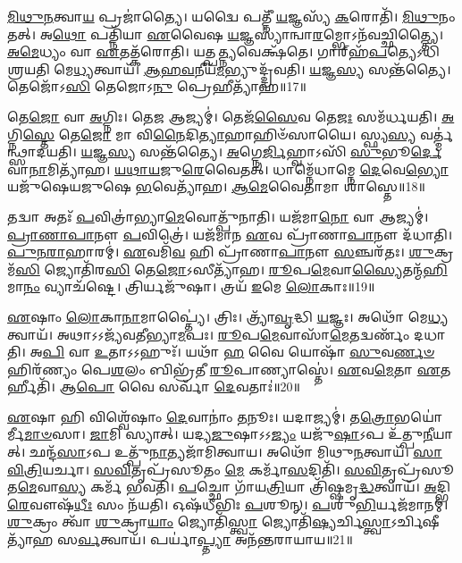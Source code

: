 \-\ul{𑌮𑌿}\-\-\ul{𑌥𑍁}\-\-\ul{𑌨}\-𑌤𑍍𑌵𑌾\-\ul{𑌯} 𑌪𑍍𑌰𑌜𑌾॑𑌤𑍍𑌯𑍈।
𑌯𑌦𑍍𑌵𑍈 𑌪𑌤𑍍𑌨𑍀᳴ \ul{𑌯}\-𑌜𑍍𑌞𑌸𑍍𑌯᳴ \ul{𑌕}\-𑌰𑍋𑌤𑌿᳴।
\-\ul{𑌮𑌿}\-\-\ul{𑌥𑍁}\-𑌨𑌂 𑌤𑌤𑍍।
𑌅\-\ul{𑌥𑍋} 𑌪𑌤𑍍𑌨𑌿᳴𑌯𑌾 \ul{𑌏}\-𑌵𑍈𑌷 \ul{𑌯}\-𑌜𑍍𑌞𑌸𑍍𑌯𑌾॑𑌨𑍍𑌵𑌾\-\ul{𑌰}\-𑌮𑍍𑌭𑍋\-𑌽𑌨᳴𑌵𑌚𑍍𑌛𑌿𑌤𑍍𑌤𑍍𑌯𑍈।
\-\ul{𑌅}\-\-\ul{𑌮𑍇}\-𑌧𑍍𑌯𑌂 𑌵𑌾 \ul{𑌏}\-𑌤𑌤𑍍𑌕᳴𑌰𑍋𑌤𑌿।
𑌯𑌤𑍍𑌪\-\ul{𑌤𑍍𑌨𑍍𑌯}\-𑌵𑍇𑌕𑍍𑌷᳴𑌤𑍇।
𑌗𑌾𑌰𑍍‌\mbox{}𑌹᳴\-\ul{𑌪}\-𑌤𑍍𑌯𑍇𑌽𑌧𑌿᳴ 𑌶𑍍𑌰𑌯𑌤𑌿 𑌮𑍇\-\ul{𑌧𑍍𑌯}\-𑌤𑍍𑌵𑌾𑌯᳴।
\-\ul{𑌆}\-\-\ul{𑌹}\-\-\ul{𑌵}\-𑌨𑍀𑌯᳴\-\ul{𑌮}\-𑌭𑍍𑌯𑍁𑌦𑍍𑌦𑍍𑌰᳴𑌵𑌤𑌿।
\-\ul{𑌯}\-𑌜𑍍𑌞\-\ul{𑌸𑍍𑌯} 𑌸𑌨𑍍𑌤᳴𑌤𑍍𑌯𑍈।
𑌤𑍇𑌜𑍋᳴𑌽\-\ul{𑌸𑌿} 𑌤𑍇𑌜𑍋𑌽\-\ul{𑌨𑍁} 𑌪𑍍𑌰𑍇𑌹𑍀𑌤𑍍𑌯𑌾᳴𑌹॥17॥

𑌤𑍇\-\ul{𑌜𑍋} 𑌵𑌾 \ul{𑌅}\-𑌗𑍍𑌨𑌿𑌃।
𑌤𑍇\-\ul{𑌜} 𑌆𑌜𑍍𑌯𑌮𑍍॑।
𑌤𑍇𑌜᳴\-\ul{𑌸𑍈}\-𑌵 𑌤𑍇\-\ul{𑌜𑌃} 𑌸𑌮᳴𑌰𑍍𑌧𑌯𑌤𑌿।
\-\ul{𑌅}\-𑌗𑍍𑌨𑌿\-\ul{𑌸𑍍𑌤𑍇} 𑌤𑍇\-\ul{𑌜𑍋} 𑌮𑌾 𑌵𑌿\-\ul{𑌨𑍈}\-𑌦𑌿\-\ul{𑌤𑍍𑌯𑌾}\-𑌹𑌾𑌹𑌿𑍞᳴𑌸𑌾𑌯𑍈।
𑌸𑍍𑌫𑍍𑌯\-\ul{𑌸𑍍𑌯} 𑌵𑌰𑍍𑌤𑍍𑌮॑𑌨𑍍𑌥𑍍𑌸𑌾𑌦𑌯𑌤𑌿।
\-\ul{𑌯}\-𑌜𑍍𑌞\-\ul{𑌸𑍍𑌯} 𑌸𑌨𑍍𑌤᳴𑌤𑍍𑌯𑍈।
\-\ul{𑌅}\-𑌗𑍍𑌨𑍇\-\ul{𑌰𑍍𑌜𑌿}\-𑌹𑍍𑌵𑌾𑌽𑌸𑌿᳴ \ul{𑌸𑍁}\-𑌭𑍂\-\ul{𑌰𑍍𑌦𑍇}\-𑌵𑌾\-\ul{𑌨𑌾}\-𑌮𑌿𑌤𑍍𑌯𑌾᳴𑌹।
\-\ul{𑌯}\-\-\ul{𑌥𑌾}\-\-\ul{𑌯}\-𑌜𑍁\-\ul{𑌰𑍇}\-𑌵𑍈𑌤𑌤𑍍।
𑌧𑌾𑌮𑍍𑌨𑍇᳴𑌧𑌾𑌮𑍍𑌨𑍇 \ul{𑌦𑍇}\-𑌵𑍇\-\ul{𑌭𑍍𑌯𑍋} 𑌯𑌜𑍁᳴𑌷𑍇𑌯𑌜𑍁𑌷𑍇 \ul{𑌭}\-𑌵𑍇𑌤𑍍𑌯𑌾᳴𑌹।
\-\ul{𑌆}\-\-\-\ul{𑌮𑍇}\-𑌵𑍈𑌤𑌾𑌮𑌾 𑌶𑌾॑𑌸𑍍𑌤𑍇॥18॥

𑌤𑌦𑍍𑌵𑌾 𑌅𑌤𑌃᳴ \ul{𑌪}\-𑌵𑌿𑌤𑍍𑌰𑌾॑𑌭𑍍𑌯𑌾\-\ul{𑌮𑍇}\-𑌵𑍋𑌤𑍍𑌪𑍁᳴𑌨𑌾𑌤𑌿।
𑌯𑌜᳴𑌮𑌾\-\ul{𑌨𑍋} 𑌵𑌾 𑌆𑌜𑍍𑌯𑌮𑍍॑।
\-\ul{𑌪𑍍𑌰𑌾}\-\-\ul{𑌣𑌾}\-\-\ul{𑌪𑌾}\-𑌨𑍗 \ul{𑌪}\-𑌵𑌿𑌤𑍍𑌰𑍇॑।
𑌯𑌜᳴𑌮𑌾𑌨 \ul{𑌏}\-𑌵 𑌪𑍍𑌰𑌾᳴𑌣𑌾\-\ul{𑌪𑌾}\-𑌨𑍗 𑌦᳴𑌧𑌾𑌤𑌿।
\-\ul{𑌪𑍁}\-\-\ul{𑌨}\-\-\ul{𑌰𑌾}\-𑌹𑌾𑌰𑌮𑍍॑।
\-\ul{𑌏}\-𑌵𑌮𑌿᳴\-\ul{𑌵} 𑌹𑌿 𑌪𑍍𑌰𑌾᳴𑌣𑌾\-\ul{𑌪𑌾}\-𑌨𑍗 \ul{𑌸}\-𑌞𑍍𑌚𑌰᳴𑌤𑌃।
\-\ul{𑌶𑍁}\-𑌕𑍍𑌰𑌮᳴\-\ul{𑌸𑌿} 𑌜𑍍𑌯𑍋𑌤𑌿᳴𑌰\-\ul{𑌸𑌿} 𑌤𑍇\-\ul{𑌜𑍋}\-\-𑌽𑌸𑍀𑌤𑍍𑌯𑌾᳴𑌹।
\-\ul{𑌰𑍂}\-𑌪\-\ul{𑌮𑍇}\-𑌵𑌾\-\ul{𑌸𑍍𑌯𑍈}\-𑌤𑌨𑍍𑌮᳴\-\ul{𑌹𑌿}\-𑌮𑌾\-\ul{𑌨𑌂} 𑌵𑍍𑌯𑌾𑌚᳴𑌷𑍍𑌟𑍇।
𑌤𑍍𑌰𑌿𑌰𑍍𑌯𑌜𑍁᳴𑌷𑌾।
𑌤𑍍𑌰𑌯᳴ \ul{𑌇}\-𑌮𑍇 \ul{𑌲𑍋}\-𑌕𑌾𑌃॥19॥

\-\ul{𑌏}\-𑌷𑌾𑌂 \ul{𑌲𑍋}\-𑌕𑌾\-\ul{𑌨𑌾}\-𑌮𑌾𑌪𑍍𑌤𑍍𑌯𑍈॑।
𑌤𑍍𑌰𑌿𑌃।
𑌤𑍍𑌰𑍍𑌯𑌾᳴\-\ul{𑌵𑍃}\-𑌦𑍍𑌧𑌿 \ul{𑌯}\-𑌜𑍍𑌞𑌃।
𑌅𑌥𑍋᳴ 𑌮𑍇\-\ul{𑌧𑍍𑌯}\-𑌤𑍍𑌵𑌾𑌯᳴।
𑌅𑌥𑌾𑌽𑌽𑌜𑍍𑌯᳴𑌵𑌤𑍀𑌭𑍍𑌯𑌾\-\ul{𑌮}\-𑌪𑌃।
\-\ul{𑌰𑍂}\-𑌪\-\ul{𑌮𑍇}\-𑌵𑌾𑌸𑌾᳴\-\ul{𑌮𑍇}\-𑌤𑌦𑍍𑌵𑌰𑍍𑌣𑌂᳴ 𑌦𑌧𑌾𑌤𑌿।
𑌅\-\ul{𑌪𑌿} 𑌵𑌾 \ul{𑌉}\-𑌤𑌾𑌽𑌽𑌹𑍁𑌃᳴।
𑌯𑌥𑌾᳴ \ul{𑌹} 𑌵𑍈 𑌯𑍋𑌷𑌾᳴ \ul{𑌸𑍁}\-𑌵\-\ul{𑌰𑍍𑌣}\-\-\ul{𑍞} 𑌹𑌿𑌰᳴𑌣𑍍𑌯𑌂 𑌪𑍇\-\ul{𑌶}\-𑌲𑌂 𑌬𑌿𑌭𑍍𑌰᳴𑌤𑍀 \ul{𑌰𑍂}\-𑌪𑌾𑌣𑍍𑌯𑌾𑌸𑍍𑌤𑍇॑।
\-\ul{𑌏}\-𑌵\-\ul{𑌮𑍇}\-𑌤𑌾 \ul{𑌏}\-𑌤𑌰𑍍\mbox{}𑌹𑍀𑌤𑌿᳴।
𑌆\-\ul{𑌪𑍋} 𑌵𑍈 𑌸𑌰𑍍𑌵𑌾᳴ \ul{𑌦𑍇}\-𑌵𑌤𑌾𑌃॑॥20॥

\-\ul{𑌏}\-𑌷𑌾 𑌹𑌿 𑌵𑌿𑌶𑍍𑌵𑍇᳴𑌷𑌾𑌂 \ul{𑌦𑍇}\-𑌵𑌾𑌨𑌾𑌂॑ \ul{𑌤}\-𑌨𑍂𑌃।
𑌯𑌦𑌾𑌜𑍍𑌯𑌮𑍍॑।
𑌤\-\ul{𑌤𑍍𑌰𑍋}\-𑌭𑌯𑍋॑𑌰𑍍𑌮𑍀\-\ul{𑌮𑌾}\-\-\ul{𑍞}\-𑌸𑌾।
\-\ul{𑌜𑌾}\-𑌮𑌿 𑌸𑍍𑌯𑌾𑌤𑍍।
𑌯𑌦𑍍𑌯\-\ul{𑌜𑍁}\-𑌷𑌾\-𑌽𑌽\-\ul{𑌜𑍍𑌯𑌂} 𑌯𑌜𑍁᳴\-\ul{𑌷𑌾}\-𑌽𑌪 𑌉᳴𑌤𑍍𑌪𑍁\-\ul{𑌨𑍀}\-𑌯𑌾𑌤𑍍।
𑌛𑌨𑍍𑌦᳴\-\ul{𑌸𑌾}\-𑌽𑌪 𑌉𑌤𑍍𑌪𑍁᳴\-\ul{𑌨𑌾}\-𑌤𑍍𑌯𑌜𑌾᳴𑌮𑌿𑌤𑍍𑌵𑌾𑌯।
𑌅𑌥𑍋᳴ 𑌮𑌿𑌥𑍁\-\ul{𑌨}\-𑌤𑍍𑌵𑌾𑌯᳴।
\-\ul{𑌸𑌾}\-\-\ul{𑌵𑌿}\-\-\ul{𑌤𑍍𑌰𑌿}\-𑌯𑌰𑍍𑌚𑌾।
\-\ul{𑌸}\-\-\ul{𑌵𑌿}\-𑌤𑍃𑌪𑍍𑌰᳴𑌸𑍂𑌤𑌂 \ul{𑌮𑍇} 𑌕𑌰𑍍𑌮𑌾᳴\-\ul{𑌸}\-𑌦𑌿𑌤𑌿᳴।
\-\ul{𑌸}\-\-\ul{𑌵𑌿}\-𑌤𑍃𑌪𑍍𑌰᳴𑌸𑍂𑌤\-\ul{𑌮𑍇}\-𑌵𑌾\-\ul{𑌸𑍍𑌯} 𑌕𑌰𑍍𑌮᳴ 𑌭𑌵𑌤𑌿।
\-\ul{𑌪}\-𑌚𑍍𑌛𑍋 𑌗𑌾᳴𑌯\-\ul{𑌤𑍍𑌰𑌿}\-𑌯𑌾 𑌤𑍍𑌰𑌿᳴𑌷𑍍𑌷𑌮𑍃\-\ul{𑌦𑍍𑌧}\-𑌤𑍍𑌵𑌾𑌯᳴।
\-\ul{𑌅}\-𑌦𑍍𑌭𑌿\-\ul{𑌰𑍇}\-𑌵𑍗𑌷᳴\-\ul{𑌧𑍀𑌃} 𑌸𑌂 𑌨᳴𑌯𑌤𑌿।
𑌓𑌷᳴𑌧𑍀𑌭𑌿𑌃 \ul{𑌪}\-𑌶𑍂𑌨𑍍।
\-\ul{𑌪}\-𑌶𑍁\-\ul{𑌭𑌿}\-𑌰𑍍𑌯𑌜᳴𑌮𑌾𑌨𑌮𑍍।
\-\ul{𑌶𑍁}\-𑌕𑍍𑌰𑌂 𑌤𑍍𑌵𑌾᳴ \ul{𑌶𑍁}\-𑌕𑍍𑌰𑌾\-\ul{𑌯𑌾𑌂} 𑌜𑍍𑌯𑍋𑌤𑌿᳴\-\ul{𑌸𑍍𑌤𑍍𑌵𑌾} 𑌜𑍍𑌯𑍋𑌤𑌿᳴\-\ul{𑌷𑍍𑌯}\-𑌰𑍍𑌚𑌿\-\ul{𑌸𑍍𑌤𑍍𑌵𑌾}\-\-𑌽𑌰𑍍𑌚𑌿𑌷𑍀𑌤𑍍𑌯𑌾᳴𑌹 𑌸\-\ul{𑌰𑍍𑌵}\-𑌤𑍍𑌵𑌾𑌯᳴।
𑌪𑌰𑍍𑌯𑌾॑\-\ul{𑌪𑍍𑌤𑍍𑌯𑌾} 𑌅𑌨᳴𑌨𑍍𑌤𑌰𑌾𑌯𑌾𑌯॥21॥\anuvakamend[\-\ul{𑌈}\-\-\ul{𑌕𑍍𑌷}\-\-\ul{𑌤} \ul{𑌆}\-\-\ul{𑌹} \ul{𑌶𑌾}\-\-\ul{𑌸𑍍𑌤𑍇} \ul{𑌲𑍋}\-𑌕𑌾 \ul{𑌦𑍇}\-𑌵𑌤𑌾᳴ 𑌭𑌵\-\ul{𑌤𑌿} 𑌷𑌟𑍍 𑌚᳴]


